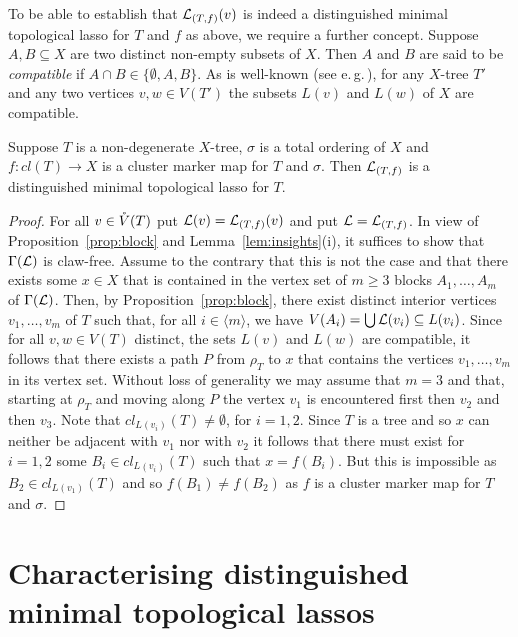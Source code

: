 To be able to establish that ${\mathcal L}_{(T,f)}(v)$ is indeed a distinguished
minimal topological lasso for $T$ and $f$ as above, we require a further
concept. Suppose $A, B\subseteq X$ are two distinct non-empty subsets of
$X$. Then $A$ and $B$ are said to be {\em compatible} if $A\cap
B\in\{\emptyset, A,B\}$. As is well-known (see
e.\,g.\,\cite{DHKMS11,semple2003phylogenetics}), for any $X$-tree $T'$ and any
two vertices $v,w\in V(T')$ the subsets $L(v)$ and $L(w)$ of $X$ are
compatible.

\begin{thm}
  \label{theo: distinguished-lasso-verification}
  Suppose $T$ is a non-degenerate $X$-tree, $\sigma$ is a total ordering of
  $X$ and $f:cl(T)\to X$ is a cluster marker map for $T$ and $\sigma$. Then
  ${\mathcal L}_{(T,f)}$ is a distinguished minimal topological lasso for $T$.
\end{thm}
\begin{proof}
  For all $v\in \mathring{V}(T)$ put ${\mathcal L}(v) = {\mathcal L}_{(T,f)}(v)$ and put
  ${\mathcal L}={\mathcal L}_{(T,f)}$.  In view of Proposition~\ref{prop:block} and
  Lemma~\ref{lem:insights}(i), it suffices to show that $\Gamma({\mathcal L})$ is
  claw-free.  Assume to the contrary that this is not the case and that there
  exists some $x\in X$ that is contained in the vertex set of $m\geq 3$ blocks
  $A_1,\ldots,A_m$ of $\Gamma({\mathcal L})$. Then, by Proposition~\ref{prop:block},
  there exist distinct interior vertices $v_1, \ldots, v_m$ of $T$ such that,
  for all $i\in\langle m\rangle$, we have $V(A_i)=\bigcup{\mathcal L}(v_i)\subseteq
  L(v_i)$.  Since for all $v,w\in V(T)$ distinct, the sets $L(v)$ and $L(w)$
  are compatible, it follows that there exists a path $P$ from $\rho_T$ to $x$
  that contains the vertices $v_1,\ldots, v_m$ in its vertex set. Without loss
  of generality we may assume that $m=3$ and that, starting at $\rho_T$ and
  moving along $P$ the vertex $v_1$ is encountered first then $v_2$ and then
  $v_3$. Note that $cl_{L(v_i)}(T)\not=\emptyset$, for $i=1,2$.  Since $T$ is
  a tree and so $x$ can neither be adjacent with $v_1$ nor with $v_2$ it
  follows that there must exist for $i=1,2$ some $B_i\in cl_{L(v_i)}(T)$ such
  that $x=f(B_i)$. But this is impossible as $B_2\in cl_{L(v_1)}(T)$ and so
  $f(B_1)\not=f(B_2)$ as $f$ is a cluster marker map for $T$ and $\sigma$.
\end{proof}

\section{Characterising distinguished minimal topological lassos}
\label{sec:characterization-distinguished}

